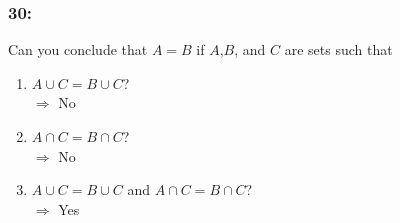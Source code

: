 \documentclass[12pt,en,a4paper]{article}
\begin{document}
	\subsubsection*{30:}
	Can you conclude that $A=B$ if $A$,$B$, and $C$ are sets such that
	\begin{enumerate}[label=\textbf{\alph*)}]
		\item $A\cup C=B\cup C$?\\
		$\Rightarrow$ No
		\item $A\cap C=B\cap C$?\\
		$\Rightarrow$ No
		\item $A\cup C=B\cup C$ and $A\cap C=B\cap C$?\\
		$\Rightarrow$ Yes
	\end{enumerate}

\end{document}
